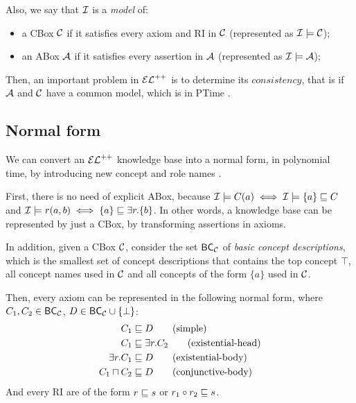 Also, we say that $\mathcal{I}$ is a \emph{model} of:
\begin{itemize}
	\item a CBox $\mathcal{C}$ if it satisfies every axiom and RI in $\mathcal{C}$ (represented as $\mathcal{I} \models \mathcal{C}$);
	\item an ABox $\mathcal{A}$ if it satisfies every assertion in $\mathcal{A}$ (represented as $\mathcal{I} \models \mathcal{A}$);
\end{itemize}

Then, an important problem in $\mathcal{EL}^{++}$ is to determine its $consistency$, that is if $\mathcal{A}$ and $\mathcal{C}$ have a common model, which is in PTime \citep{Baader2005a}.

\subsection{Normal form}
We can convert an $\mathcal{EL}^{++}$ knowledge base into a normal form, in polynomial time, by introducing new concept and role names \citep{Baader2005a}.

First, there is no need of explicit ABox, because $\mathcal{I} \models C(a)\iff \mathcal{I} \models \{a\} \sqsubseteq C$ and $\mathcal{I} \models r(a, b) \iff \{a\} \sqsubseteq \exists r.\{b\}$. In other words, a knowledge base can be represented by just a CBox, by transforming assertions in axioms.

In addition, given a CBox $\mathcal{C}$, consider the set $\mathsf{BC}_\mathcal{C}$ of \emph{basic concept descriptions}, which is the smallest set of concept descriptions that contains the top concept $\top$, all concept names used in $\mathcal{C}$ and all concepts of the form $\{a\}$ used in $\mathcal{C}$.

Then, every axiom can be represented in the following normal form, where $C_1, C_2 \in \mathsf{BC}_\mathcal{C}$, $D \in \mathsf{BC}_\mathcal{C} \cup \{\bot\}$:
\begin{align*}
	C_1            & \sqsubseteq D             \tag{simple}           \\
	C_1            & \sqsubseteq \exists r.C_2 \tag{existential-head} \\
	\exists r.C_1  & \sqsubseteq D             \tag{existential-body} \\
	C_1 \sqcap C_2 & \sqsubseteq D  \tag{conjunctive-body}
\end{align*}
And every RI are of the form $r \sqsubseteq s$ or $r_1 \circ r_2 \sqsubseteq s$.

